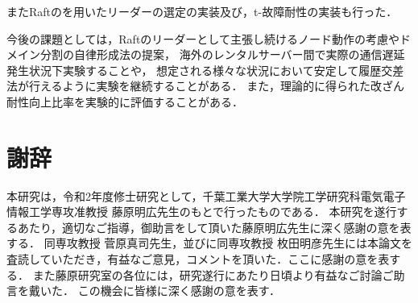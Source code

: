 \documentclass[a4paper,12pt]{jsarticle}
\begin{document}
またRaftのを用いたリーダーの選定の実装及び，t-故障耐性の実装も行った．

今後の課題としては，Raftのリーダーとして主張し続けるノード動作の考慮やドメイン分割の自律形成法の提案，
海外のレンタルサーバー間で実際の通信遅延発生状況下実験することや，
想定される様々な状況において安定して履歴交差法が行えるように実験を継続することがある．
また，理論的に得られた改ざん耐性向上比率を実験的に評価することがある．

\newpage
\section*{謝辞}

本研究は，令和2年度修士研究として，千葉工業大学大学院工学研究科電気電子情報工学専攻准教授 藤原明広先生のもとで行ったものである．
本研究を遂行するあたり，適切なご指導，御助言をして頂いた藤原明広先生に深く感謝の意を表する．
同専攻教授 菅原真司先生，並びに同専攻教授 枚田明彦先生には本論文を査読していただき，有益なご意見，コメントを頂いた．ここに感謝の意を表する．
また藤原研究室の各位には，研究遂行にあたり日頃より有益なご討論ご助言を戴いた．
この機会に皆様に深く感謝の意を表す．

\newpage
\end{document}
